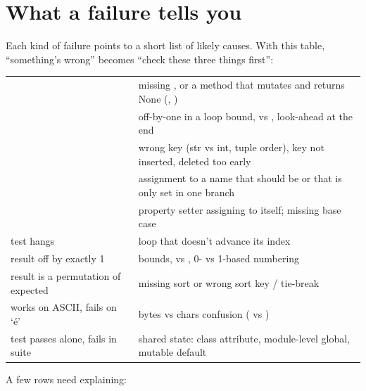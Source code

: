 \documentclass[10pt,a4paper]{article}
\begin{document}
\section{What a failure tells you}
Each kind of failure points to a short list of likely causes. With this table, “something’s wrong” becomes “check these three things first”:
\begin{datatable}{}{\footnotesize}
\begin{xltabular}{\linewidth}{@{}Y{0.57}Y{1.43}@{}}
 &  \\ \hline
\endhead
{} & missing , or a method that mutates and returns None (, ) \\
 & off-by-one in a loop bound,  vs \code{\textless{}\allowbreak{}=\allowbreak{}}, look-ahead  at the end \\
 & wrong key (str vs int, tuple order), key not inserted, deleted too early \\
 & assignment to a name that should be  or that is only set in one branch \\
 & property setter assigning to itself; missing base case \\
test hangs &  loop that doesn’t advance its index \\
result off by exactly 1 &  bounds, \code{\textless{}\allowbreak{}} vs \code{\textless{}\allowbreak{}=\allowbreak{}}, 0- vs 1-based numbering \\
result is a permutation of expected & missing sort or wrong sort key / tie-break \\
works on ASCII, fails on ‘é’ & bytes vs chars confusion ( vs ) \\
test passes alone, fails in suite & shared state: class attribute, module-level global, mutable default \\
\hline
\end{xltabular}
\end{datatable}
A few rows need explaining:
\end{document}
